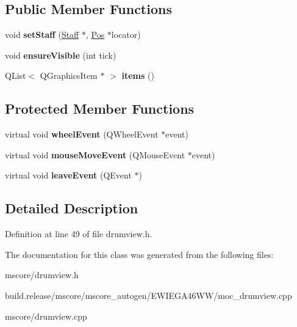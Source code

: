 \subsection*{Public Member Functions}
\begin{DoxyCompactItemize}
\item 
\mbox{\label{class_ms_1_1_drum_view_a4b901c5c148d645e66339a705932e2de}} 
void {\bfseries set\+Staff} (\hyperlink{class_ms_1_1_staff}{Staff} $\ast$, \hyperlink{class_ms_1_1_pos}{Pos} $\ast$locator)
\item 
\mbox{\label{class_ms_1_1_drum_view_afcd9a17170ef120676aa83ca64b7fbff}} 
void {\bfseries ensure\+Visible} (int tick)
\item 
\mbox{\label{class_ms_1_1_drum_view_abb7187fea9f7c3d22de67404a138a62d}} 
Q\+List$<$ Q\+Graphics\+Item $\ast$ $>$ {\bfseries items} ()
\end{DoxyCompactItemize}
\subsection*{Protected Member Functions}
\begin{DoxyCompactItemize}
\item 
\mbox{\label{class_ms_1_1_drum_view_a3e22eaecfc3ec31d20b30dc277ccc3a6}} 
virtual void {\bfseries wheel\+Event} (Q\+Wheel\+Event $\ast$event)
\item 
\mbox{\label{class_ms_1_1_drum_view_a9665aa61518d83bacc6bf3ddbd30cd38}} 
virtual void {\bfseries mouse\+Move\+Event} (Q\+Mouse\+Event $\ast$event)
\item 
\mbox{\label{class_ms_1_1_drum_view_aeaa9d4e6a48829741b051cad452404d5}} 
virtual void {\bfseries leave\+Event} (Q\+Event $\ast$)
\end{DoxyCompactItemize}


\subsection{Detailed Description}


Definition at line 49 of file drumview.\+h.



The documentation for this class was generated from the following files\+:\begin{DoxyCompactItemize}
\item 
mscore/drumview.\+h\item 
build.\+release/mscore/mscore\+\_\+autogen/\+E\+W\+I\+E\+G\+A46\+W\+W/moc\+\_\+drumview.\+cpp\item 
mscore/drumview.\+cpp\end{DoxyCompactItemize}
